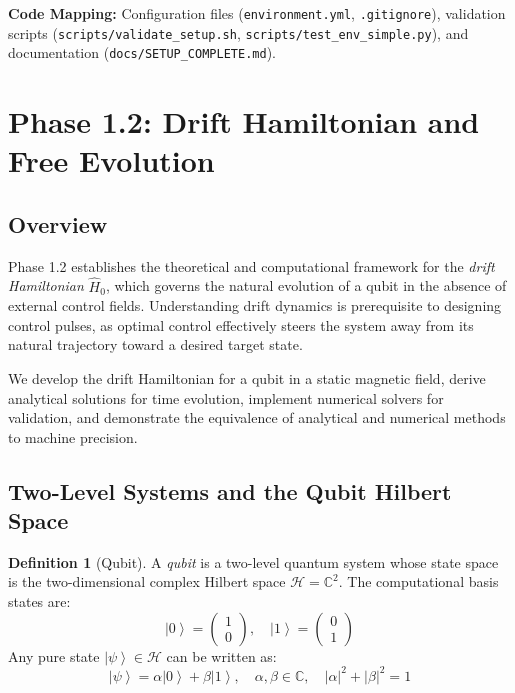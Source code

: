 \documentclass[11pt,a4paper]{article}
\theoremstyle{definition}
\newtheorem{definition}{Definition}[section]
\theoremstyle{remark}
\newcommand{\ket}[1]{\left|#1\right\rangle}
\newcommand{\hilbert}{\mathcal{H}}
\newcommand{\CC}{\mathbb{C}}
\begin{document}
\textbf{Code Mapping:} Configuration files (\texttt{environment.yml}, \texttt{.gitignore}), validation scripts (\texttt{scripts/validate\_setup.sh}, \texttt{scripts/test\_env\_simple.py}), and documentation (\texttt{docs/SETUP\_COMPLETE.md}).

\section{Phase 1.2: Drift Hamiltonian and Free Evolution}
\label{sec:phase1.2}

\subsection{Overview}

Phase 1.2 establishes the theoretical and computational framework for the \emph{drift Hamiltonian} $\hat{H}_0$, which governs the natural evolution of a qubit in the absence of external control fields. Understanding drift dynamics is prerequisite to designing control pulses, as optimal control effectively steers the system away from its natural trajectory toward a desired target state.

We develop the drift Hamiltonian for a qubit in a static magnetic field, derive analytical solutions for time evolution, implement numerical solvers for validation, and demonstrate the equivalence of analytical and numerical methods to machine precision.

\subsection{Two-Level Systems and the Qubit Hilbert Space}

\begin{definition}[Qubit]
A \emph{qubit} is a two-level quantum system whose state space is the two-dimensional complex Hilbert space $\hilbert = \CC^2$. The computational basis states are:
\begin{equation}
\ket{0} = \begin{pmatrix} 1 \\ 0 \end{pmatrix}, \quad
\ket{1} = \begin{pmatrix} 0 \\ 1 \end{pmatrix}
\end{equation}
Any pure state $\ket{\psi} \in \hilbert$ can be written as:
\begin{equation}
\ket{\psi} = \alpha \ket{0} + \beta \ket{1}, \quad \alpha, \beta \in \CC, \quad |\alpha|^2 + |\beta|^2 = 1
\end{equation}
\end{definition}
\end{document}

